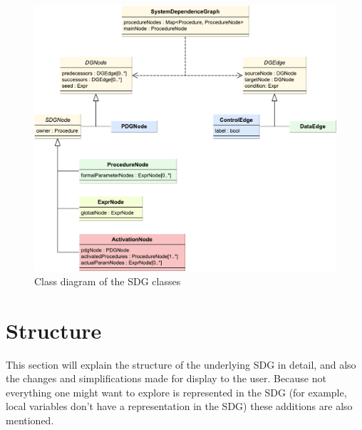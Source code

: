 \begin{figure}[hpb]
  \centering
    \includegraphics[width=\textwidth]{bilder/sdg-class}
  \caption{Class diagram of the SDG classes}
  \label{fig:sdg-class}
\end{figure}


\section{Structure}

This section will explain the structure of the underlying SDG in detail, and also the changes and simplifications made 
for display to the user. Because not everything one might want to explore is represented in the SDG (for example, local 
variables don't have a representation in the SDG) these additions are also mentioned.

